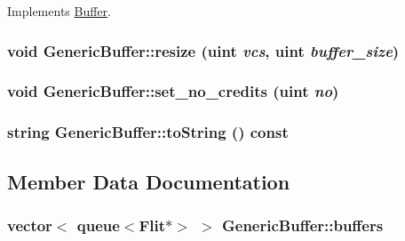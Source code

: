 Implements \hyperlink{classBuffer_c9dce1860c655146f000df30314caaa9}{Buffer}.\hypertarget{classGenericBuffer_d2b0822ec5f56ebea495b19562028f4c}{
\subsubsection[{resize}]{\setlength{\rightskip}{0pt plus 5cm}void GenericBuffer::resize ({\bf uint} {\em vcs}, \/  {\bf uint} {\em buffer\_\-size})}}
\label{classGenericBuffer_d2b0822ec5f56ebea495b19562028f4c}


\hypertarget{classGenericBuffer_222b1ccd9db0a123acb9f3d34d38881c}{
\subsubsection[{set\_\-no\_\-credits}]{\setlength{\rightskip}{0pt plus 5cm}void GenericBuffer::set\_\-no\_\-credits ({\bf uint} {\em no})}}
\label{classGenericBuffer_222b1ccd9db0a123acb9f3d34d38881c}


\hypertarget{classGenericBuffer_3e9808bf28490fcc38ba13e7eb6ef501}{
\subsubsection[{toString}]{\setlength{\rightskip}{0pt plus 5cm}string GenericBuffer::toString () const}}
\label{classGenericBuffer_3e9808bf28490fcc38ba13e7eb6ef501}




\subsection{Member Data Documentation}
\hypertarget{classGenericBuffer_827e77b8ad0d8fcd36c95e63b6ed8001}{
\subsubsection[{buffers}]{\setlength{\rightskip}{0pt plus 5cm}vector$<$ queue$<${\bf Flit}$\ast$$>$ $>$ {\bf GenericBuffer::buffers}}}
\label{classGenericBuffer_827e77b8ad0d8fcd36c95e63b6ed8001}


